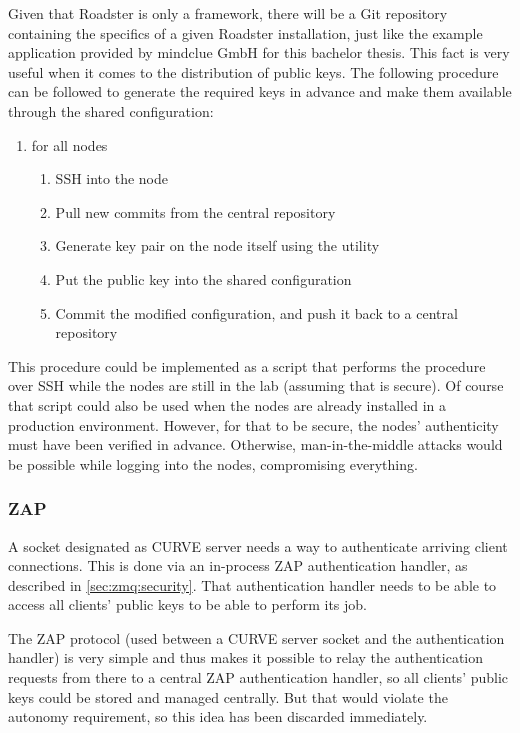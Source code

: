 Given that Roadster is only a framework, there will be a Git repository
containing the specifics of a given Roadster installation, just like the
example application provided by mindclue GmbH for this bachelor thesis.
This fact is very useful when it comes to the distribution of public keys.
The following procedure can be followed to generate the required keys in
advance and make them available through the shared configuration:

\begin{enumerate}
	\item for all nodes
	\begin{enumerate}
		\item SSH into the node
		\item Pull new commits from the central repository
		\item Generate key pair on the node itself using the  utility
		\item Put the public key into the shared configuration
		\item Commit the modified configuration, and push it back to a central repository
	\end{enumerate}
\end{enumerate}

This procedure could be implemented as a script that performs the procedure
over \gls{SSH} while the nodes are still in the
lab (assuming that is secure). Of course that script could also be used when
the nodes are already installed in a production environment. However, for that to be
secure, the nodes' authenticity must have been verified in advance. Otherwise,
man-in-the-middle attacks would be possible while logging into the nodes,
compromising everything.

\subsubsection{ZAP}
A socket designated as CURVE server needs a way to authenticate arriving client
connections. This is done via an in-process \gls{ZAP} authentication handler,
as described in \autoref{sec:zmq:security}. That authentication handler
needs to be able to access all clients' public keys to be able to perform its
job.

The ZAP protocol (used between a CURVE server socket and the authentication
handler) is very simple and thus makes it possible to relay the authentication
requests from there to a central ZAP authentication handler, so all clients'
public keys could be stored and managed centrally. But that would violate the
autonomy requirement, so this idea has been discarded immediately.

